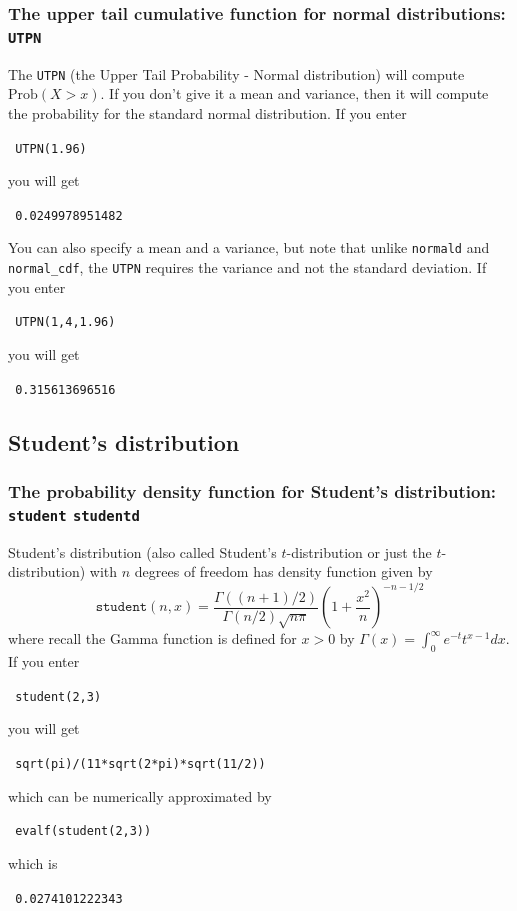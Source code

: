 \documentclass[a4paper,11pt]{book}
\begin{document}
\subsubsection{The upper tail cumulative function for normal
distributions: \texttt{UTPN}}

The \texttt{UTPN} (the Upper Tail Probability - Normal distribution) will compute
$\text{Prob}(X > x)$.  If you don't give it a mean and variance, then
it will compute the probability for the standard normal distribution.
If you enter
\begin{center}
  \tt
  UTPN(1.96)
\end{center}
you will get
\begin{center}
  \tt
  0.0249978951482
\end{center}
You can also specify a mean and a variance, but note that unlike
\texttt{normald} and \texttt{normal\_cdf}, the \texttt{UTPN} requires
the variance and not the standard deviation.  If you enter
\begin{center}
  \tt
  UTPN(1,4,1.96)
\end{center}
you will get
\begin{center}
  \tt
  0.315613696516
\end{center}

\subsection{Student's distribution}

\subsubsection{The probability density function for Student's
distribution: \texttt{student} \texttt{studentd}}

Student's distribution (also called Student's $t$-distribution or just
the $t$-distribution) with
$n$ degrees of freedom has density function given by
\[
\texttt{student}(n,x) =
\frac{\Gamma((n+1)/2)}{\Gamma(n/2)\sqrt{n\pi}}\left(1 +
\frac{x^2}{n}\right)^{-n-1/2}
\]
where recall the Gamma function is defined for $x>0$ by $\Gamma(x) =
\int_0^\infty e^{-t}t^{x-1}dx$.  If you enter
\begin{center}
  \tt
  student(2,3)
\end{center}
you will get
\begin{center}
  \tt
  sqrt(pi)/(11*sqrt(2*pi)*sqrt(11/2))
\end{center}
which can be numerically approximated by
\begin{center}
  \tt
  evalf(student(2,3))
\end{center}
which is
\begin{center}
  \tt
  0.0274101222343
\end{center}
\end{document}
